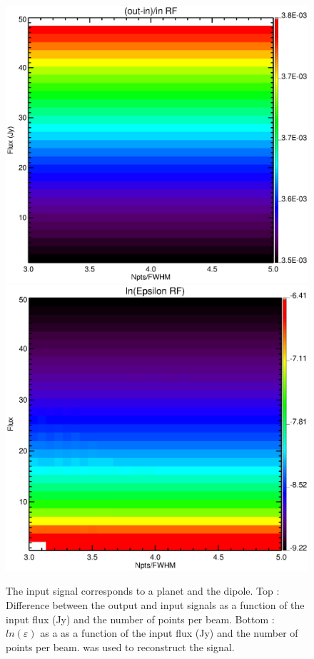 \begin{figure}[h]
\center
	\includegraphics[scale=0.2]{Figures/diff_rf_planet_dipole.eps}
	\includegraphics[scale=0.2]{Figures/epsilon_rf_planet_dipole.eps}
	\caption{The input signal corresponds to a planet and the dipole. Top : Difference between the output and input signals as a function of the input flux (Jy) and the number of points per beam. Bottom : $ln(\varepsilon)$ as a as a function of the input flux (Jy) and the number of points per beam. \rf was used to reconstruct the signal.}
	\label{fig:epsilon-rf-planet-dipole}
\end{figure}

